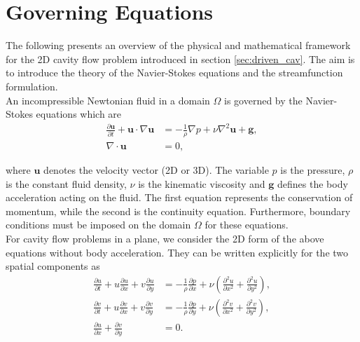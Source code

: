 
\section{Governing Equations} \label{sec:gov_equ}

The following presents an overview of the physical and mathematical framework
for the 2D cavity flow problem introduced in section \ref{sec:driven_cav}. The
aim is to introduce the theory of the Navier-Stokes equations and the
streamfunction formulation. \\

An incompressible Newtonian fluid in a domain $\Omega$ is governed by the
Navier-Stokes equations which are
\vspace{-10pt}
\begin{align}
\frac{\partial \mathbf{u}}{\partial t} + 
  \mathbf{u} \cdot \nabla \mathbf{u} &= 
  - \frac{1}{\rho} \nabla p + \nu \nabla^2 \mathbf{u} + \mathbf{g},
  \label{eq:ns3d} \\
\nabla \cdot \mathbf{u} &= 0 \label{eq:cont3d},
\end{align}

where $\mathbf{u}$ denotes the velocity vector (2D or 3D). The variable $p$
is the pressure, $\rho$ is the constant fluid density, $\nu$ is the
kinematic viscosity and $\mathbf{g}$ defines the body acceleration acting on
the fluid. The first equation represents the conservation of momentum, while
the second is the continuity equation. Furthermore, boundary conditions must be
imposed on the domain $\Omega$ for these equations. \\

For cavity flow problems in a plane, we consider the 2D form of the above
equations without body acceleration. They can be written explicitly for the two
spatial components as
\begin{align}
\frac{\partial u}{\partial t} + u \frac{\partial u}{\partial x} 
  + v \frac{\partial u}{\partial y} &= 
  - \frac{1}{\rho}\frac{\partial p}{\partial x}
  + \nu \left(\frac{\partial^2 u}{\partial x^2}
  + \frac{\partial^2 u}{\partial y^2}\right) \label{eq:ns2d-u}, \\
\frac{\partial v}{\partial t} + u \frac{\partial v}{\partial x}
  + v \frac{\partial v}{\partial y} &=
  - \frac{1}{\rho}\frac{\partial p}{\partial y} 
  + \nu \left(\frac{\partial^2 v}{\partial x^2}
  + \frac{\partial^2 v}{\partial y^2}\right) \label{eq:ns2d-v}, \\ 
\frac{\partial u}{\partial x}
  + \frac{\partial v}{\partial y} &= 0 \label{eq:cont2d}.
\end{align}

